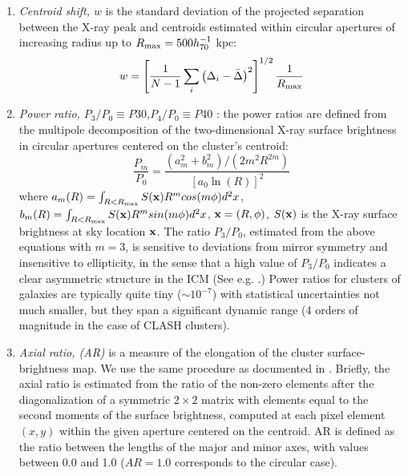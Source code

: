 \documentclass[iop,twocolumn]{emulateapj}
\begin{document}
{\begin{enumerate}
\item {\it Centroid shift, $w$} \citep[e.g.][]{2006MNRAS.373..881P, 2006ApJ...639...64O, 2008ApJ...685..118V, 2008ApJS..174..117M, 
2010A&A...514A..32B, 2010ApJ...721L..82C,rasia.etal.2013} is the standard deviation of the projected separation between the X-ray peak 
and centroids estimated within circular apertures of increasing radius up to $R_{\rm max} = 500 h_{70}^{-1}$ kpc:
\begin{equation}
w = \left[ \frac{1}{N-1} \sum_i \left( \Delta_i - \bar{\Delta} \right)^2 \right]^{1/2} \frac{1}{R_{\rm max}}
\end{equation}

\item {\it Power ratio, $P_3/P_0 \equiv P30$,$P_4/P_0 \equiv P40$ }: the power ratios are defined from the multipole decomposition of the 
two-dimensional X-ray surface brightness in circular apertures centered on the cluster's centroid:
\begin{equation}
\frac{P_m}{P_0} = \frac{(a_m^2+b_m^2)/(2 m^2 R^{2m})}{\left[ a_0 \ln( R ) \right]^2}
\end{equation}
where $a_m( R ) = \int_{R<R_{\rm max}}{S({\bf x}) R^m cos(m\phi) d^2x}$, $b_m( R ) = \int_{R<R_{\rm max}}{S({\bf x}) R^m sin(m\phi) d^2x}$, 
${\bf x} = (R, \phi)$, $S({\bf x})$ is the X-ray surface brightness at sky location ${\bf x}$. The ratio $P_3/P_0$, estimated from the above equations with $m=3$, 
is sensitive to deviations from mirror symmetry and insensitive to ellipticity, in the sense that a high value of $P_3/P_0$ 
indicates a clear asymmetric structure 
in the ICM (See e.g. \citealt[][]{1995ApJ...452..522B, 1996ApJ...458...27B, 2005ApJ...624..606J, 2008ApJ...685..118V,2010A&A...514A..32B, 2010ApJ...721L..82C,
rasia.etal.2013}.) Power ratios for clusters of galaxies are typically quite tiny ($\sim 10^{-7}$) with statistical uncertainties not much smaller, but they span a significant dynamic range (4 orders of magnitude in the case of CLASH clusters). 


\item {\it Axial ratio, (AR)} is a measure of the elongation of the cluster surface-brightness map. We use the same 
procedure as documented in \citep{2015ApJ...805..177D}.
Briefly, the axial ratio is estimated 
from the ratio of the non-zero elements after the diagonalization of a symmetric $2\times2$ matrix with elements equal to the second moments 
of the surface brightness, computed at each pixel element $(x,y)$ within the given aperture centered on the centroid. 
AR is defined as the ratio between the lengths of the major and minor axes, 
with values between 0.0 and 1.0 ($AR=1.0$ corresponds to the circular case). 


\end{enumerate}}
\end{document}
